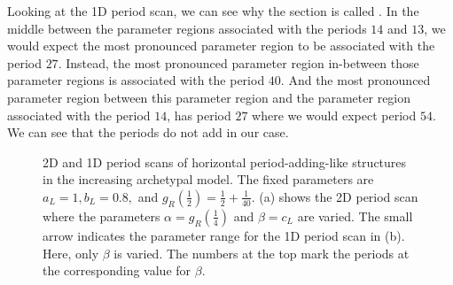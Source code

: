 Looking at the 1D period scan, we can see why the section is called .
In the middle between the parameter regions associated with the periods $14$ and $13$, we would expect the most pronounced parameter region to be associated with the period $27$.
Instead, the most pronounced parameter region in-between those parameter regions is associated with the period $40$.
And the most pronounced parameter region between this parameter region and the parameter region associated with the period $14$, has period $27$ where we would expect period $54$.
We can see that the periods do not add in our case.

\begin{figure}
	\centering
	\caption[2D and 1D period scans of horizontal period-adding-like structures in the increasing archetypal model]{
		2D and 1D period scans of horizontal period-adding-like structures in the increasing archetypal model.
		The fixed parameters are $a_L = 1, b_L = 0.8,$ and $g_R\left(\frac{1}{2}\right) = \frac{1}{2} + \frac{1}{40}$.
		(a) shows the 2D period scan where the parameters $\alpha = g_R\left(\frac{1}{4}\right)$ and $\beta = c_L$ are varied.
		The small arrow indicates the parameter range for the 1D period scan in (b).
		Here, only $\beta$ is varied.
		The numbers at the top mark the periods at the corresponding value for $\beta$.
	}
	\label{fig:add.add.like.hor}
\end{figure}

